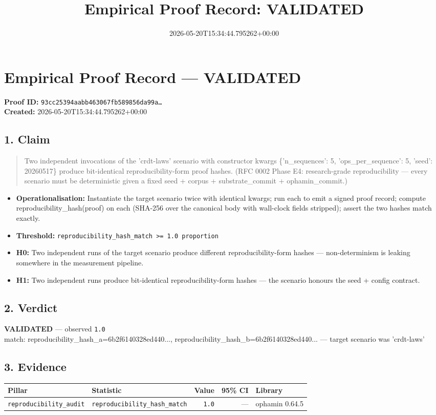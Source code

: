 \documentclass{article}
\title{Empirical Proof Record: VALIDATED}
\date{2026-05-20T15:34:44.795262+00:00}
\begin{document}
\maketitle
\section*{Empirical Proof Record --- \textcolor{validated}{\textbf{VALIDATED}}}
\textbf{Proof ID:} \texttt{93cc25394aabb463067fb589856da99a\dots}\\
\textbf{Created:} 2026-05-20T15:34:44.795262+00:00
\subsection*{1. Claim}
\begin{quote}Two independent invocations of the 'crdt-laws' scenario with constructor kwargs \{'n\_sequences': 5, 'ops\_per\_sequence': 5, 'seed': 20260517\} produce bit-identical reproducibility-form proof hashes. (RFC 0002 Phase E4: research-grade reproducibility — every scenario must be deterministic given a fixed seed + corpus + substrate\_commit + ophamin\_commit.)\end{quote}
\begin{itemize}
\item \textbf{Operationalisation:} Instantiate the target scenario twice with identical kwargs; run each to emit a signed proof record; compute reproducibility\_hash(proof) on each (SHA-256 over the canonical body with wall-clock fields stripped); assert the two hashes match exactly.
\item \textbf{Threshold:} \texttt{reproducibility\_hash\_match >= 1.0 proportion}
\item \textbf{H0:} Two independent runs of the target scenario produce different reproducibility-form hashes — non-determinism is leaking somewhere in the measurement pipeline.
\item \textbf{H1:} Two independent runs produce bit-identical reproducibility-form hashes — the scenario honours the seed + config contract.
\end{itemize}
\subsection*{2. Verdict}
\textcolor{validated}{\textbf{VALIDATED}} --- observed \texttt{1.0}\\
match: reproducibility\_hash\_a=6b2f6140328ed440..., reproducibility\_hash\_b=6b2f6140328ed440... — target scenario was 'crdt-laws'
\subsection*{3. Evidence}
\begin{tabular}{llrrl}\toprule
\textbf{Pillar} & \textbf{Statistic} & \textbf{Value} & \textbf{95\% CI} & \textbf{Library} \\\midrule
\texttt{reproducibility\_audit} & \texttt{reproducibility\_hash\_match} & \texttt{1.0} & --- & ophamin 0.64.5 \\
\bottomrule\end{tabular}
\end{document}
